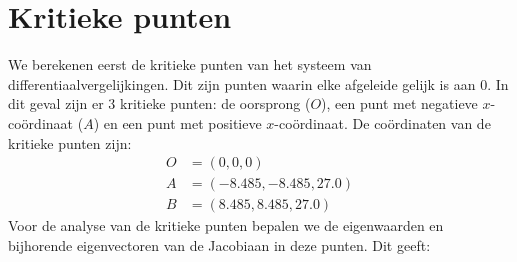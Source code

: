 \documentclass[12pt, a4paper]{article}
\theoremstyle{definition}
\begin{document}
\section{Kritieke punten}
We berekenen eerst de kritieke punten van het systeem van differentiaalvergelijkingen. Dit zijn punten waarin elke afgeleide gelijk is aan 0. In dit geval zijn er 3 kritieke punten: de oorsprong ($O$), een punt met negatieve $x$-coördinaat ($A$) en een punt met positieve $x$-coördinaat. De coördinaten van de kritieke punten zijn:
\begin{align*}
    O &= (0, 0, 0)\\
    A &= (-8.485, -8.485, 27.0)\\
    B &= (8.485, 8.485, 27.0)
\end{align*}
Voor de analyse van de kritieke punten bepalen we de eigenwaarden en bijhorende eigenvectoren van de Jacobiaan in deze punten. Dit geeft:
\end{document}
